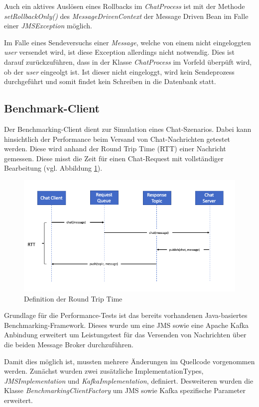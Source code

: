 \documentclass[10pt,journal,compsoc]{IEEEtran}
\begin{document}
Auch ein aktives Auslösen eines Rollbacks im \textit{ChatProcess} ist mit der Methode \textit{setRollbackOnly()} des \textit{MessageDrivenContext} der Message Driven Bean im Falle einer \textit{JMSException} möglich. 

Im Falle eines Sendeversuchs einer \textit{Message}, welche von einem nicht eingeloggten \textit{user} versendet wird, ist diese Exception allerdings nicht notwendig. Dies ist darauf zurückzuführen, dass in der Klasse \textit{ChatProcess} im Vorfeld überpüft wird, ob der \textit{user} eingeolgt ist. Ist dieser nicht eingeloggt, wird kein Sendeprozess durchgeführt und somit findet kein Schreiben in die Datenbank statt. 


\subsection{Benchmark-Client}

Der Benchmarking-Client dient zur Simulation eines Chat-Szenarios. Dabei kann hinsichtlich der Performance beim Versand von Chat-Nachrichten getestet werden. Diese wird anhand der Round Trip Time (RTT) einer Nachricht gemessen. Diese misst die Zeit für einen Chat-Request mit vollständiger Bearbeitung (vgl. Abbildung \ref{fig:RTT}). 

\begin{figure}[h]
	\centering
	\includegraphics[scale=0.35]{Bilder/RTT.PNG}
	\caption{Definition der Round Trip Time}
	\label{fig:RTT}
\end{figure}

Grundlage für die Performance-Tests ist das bereits vorhandenen Java-basiertes Benchmarking-Framework. Dieses wurde um eine JMS sowie eine Apache Kafka Anbindung erweitert um Leistungstest für das Versenden von Nachrichten über die beiden Message Broker durchzuführen.

Damit dies möglich ist, mussten mehrere Änderungen im Quellcode vorgenommen werden. Zunächst wurden zwei zusätzliche ImplementationTypes, \textit{JMSImplementation} und \textit{KafkaImplementation}, definiert. Desweiteren wurden die Klasse \textit{BenchmarkingClientFactory} um JMS sowie Kafka spezifische Parameter erweitert.
\end{document}
